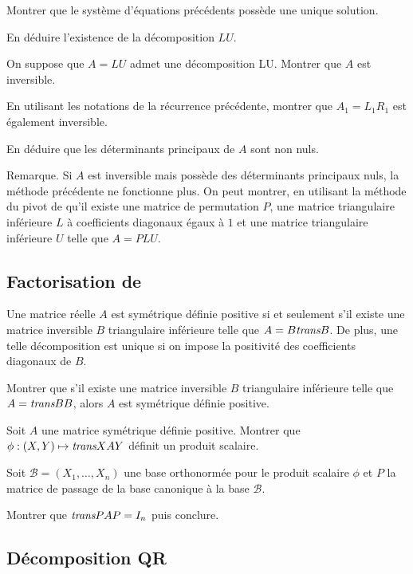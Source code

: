 Montrer que le système d'équations précédents possède une unique solution.

En déduire l'existence de la décomposition $L U$.

On suppose que $A = L U$ admet une décomposition LU.
Montrer que $A$ est inversible.

En utilisant les notations de la récurrence précédente, montrer que $A_1 = L_1 R_1$ est également inversible.

En déduire que les déterminants principaux de $A$ sont non nuls.

\medskip

{Remarque.} Si $A$ est inversible mais possède des déterminants principaux nuls, la méthode précédente ne fonctionne plus. On peut montrer, en utilisant la méthode du pivot de \cite{Gauss} qu'il existe une matrice de permutation $P$, une matrice triangulaire inférieure $L$ à coefficients diagonaux égaux à $1$ et une matrice triangulaire inférieure $U$ telle que $A = P L U$.

\subsection{Factorisation de \cite{Cholesky}}

\begin{theo}
Une matrice réelle $A$ est symétrique définie positive si et seulement s'il existe une matrice inversible $B$ triangulaire inférieure telle que $A = B \textit{trans}{B}$. De plus, une telle décomposition est unique si on impose la positivité des coefficients diagonaux de $B$.
\end{theo}

Montrer que s'il existe une matrice inversible $B$ triangulaire inférieure telle que $A = \textit{trans}{B} B$, alors $A$ est symétrique définie positive.

Soit $A$ une matrice symétrique définie positive.
Montrer que $\phi : (X, Y) \mapsto \textit{trans}{X} A Y$ définit un produit scalaire.

Soit $\mathscr{B} = (X_1,\ldots,X_n)$ une base orthonormée pour le produit scalaire $\phi$ et $P$ la matrice de passage de la base canonique à la base $\mathscr{B}$.

Montrer que $\textit{trans}{P} A P = I_n$ puis conclure.


\subsection{Décomposition QR}

